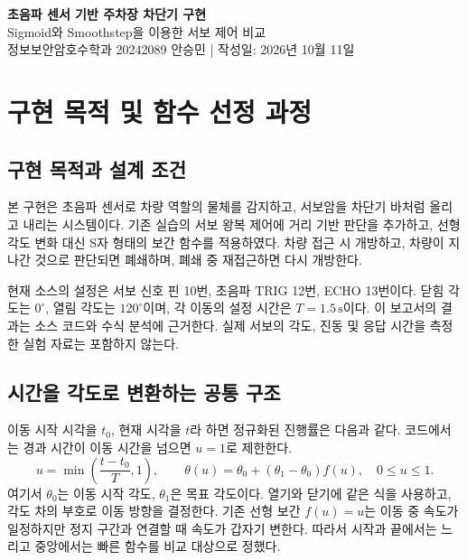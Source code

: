 \documentclass[a4paper,10pt]{article}
\begin{document}
\begin{center}
{\LARGE\bfseries 초음파 센서 기반 주차장 차단기 구현}\\[5pt]
{\large Sigmoid와 Smoothstep을 이용한 서보 제어 비교}\\[5pt]
{\small 정보보안암호수학과 20242089 안승민 \quad |  작성일: 2026년 10월 11일}
\end{center}

\section{구현 목적 및 함수 선정 과정}
\subsection{구현 목적과 설계 조건}
본 구현은 초음파 센서로 차량 역할의 물체를 감지하고, 서보암을 차단기 바처럼
올리고 내리는 시스템이다. 기존 실습의 서보 왕복 제어에 거리 기반 판단을 추가하고,
선형 각도 변화 대신 S자 형태의 보간 함수를 적용하였다. 차량 접근 시 개방하고,
차량이 지나간 것으로 판단되면 폐쇄하며, 폐쇄 중 재접근하면 다시 개방한다.

현재 소스의 설정은 서보 신호 핀 10번, 초음파 TRIG 12번, ECHO 13번이다.
닫힘 각도는 $0^\circ$, 열림 각도는 $120^\circ$이며, 각 이동의 설정 시간은
$T=1.5\,\mathrm{s}$이다. 이 보고서의 결과는 소스 코드와 수식 분석에 근거한다.
실제 서보의 각도, 진동 및 응답 시간을 측정한 실험 자료는 포함하지 않는다.

\subsection{시간을 각도로 변환하는 공통 구조}
이동 시작 시각을 $t_0$, 현재 시각을 $t$라 하면 정규화된 진행률은
다음과 같다. 코드에서는 경과 시간이 이동 시간을 넘으면 $u=1$로 제한한다.
\begin{equation}
u=\min\left(\frac{t-t_0}{T},1\right),\qquad
\theta(u)=\theta_0+(\theta_1-\theta_0)f(u),\quad 0\leq u\leq1.
\end{equation}
여기서 $\theta_0$는 이동 시작 각도, $\theta_1$은 목표 각도이다.
열기와 닫기에 같은 식을 사용하고, 각도 차의 부호로 이동 방향을 결정한다.
기존 선형 보간 $f(u)=u$는 이동 중 속도가 일정하지만 정지 구간과 연결할 때
속도가 갑자기 변한다. 따라서 시작과 끝에서는 느리고 중앙에서는 빠른 함수를 비교 대상으로 정했다.
\end{document}
